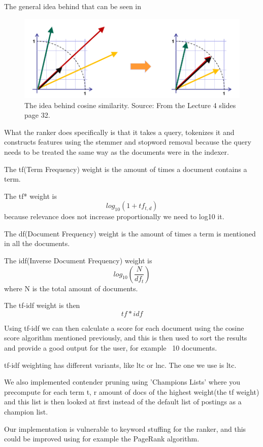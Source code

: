 	The general idea behind that can be seen in 
	
	\begin{figure}[H]
	\centering
	\includegraphics[width=0.7\linewidth]{Media/CosineSimilarity}
	\caption{The idea behind cosine similarity. Source: From the Lecture 4 slides page 32.}
	\label{fig:CosineSimilarity}
	\end{figure}
	
	What the ranker does specifically is that it takes a query, tokenizes it and constructs features using the stemmer and stopword removal because the query needs to be treated the same way as the documents were in the indexer.
	
	The tf(Term Frequency) weight is the amount of times a document contains a term.
	
	The tf* weight is $$log_{10}(1+tf_{t,d})$$ because relevance does not increase proportionally we need to log10 it.
	
	The df(Document Frequency) weight is the amount of times a term is mentioned in all the documents.
	
	The idf(Inverse Document Frequency) weight is $$log_{10}(\frac{N}{df_{t}})$$ where N is the total amount of documents.
	
	The tf-idf weight is then $$tf*idf$$
	
	Using tf-idf we can then calculate a score for each document using the cosine score algorithm mentioned previously, and this is then used to sort the results and provide a good output for the user, for example ~10 documents.
	
	tf-idf weighting has different variants, like ltc or lnc. The one we use is ltc.
	
	We also implemented contender pruning using 'Champions Lists' where you precompute for each term t, r amount of docs of the highest weight(the tf weight) and this list is then looked at first instead of the default list of postings as a champion list.
	
	Our implementation is vulnerable to keyword stuffing for the ranker, and this could be improved using for example the PageRank algorithm.
	
